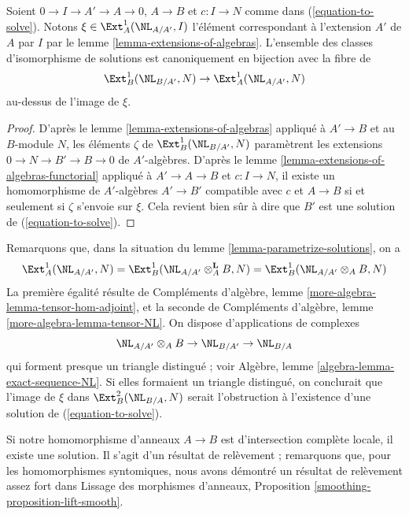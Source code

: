 \begin{lemma}
\label{lemma-parametrize-solutions}
Soient $0 \to I \to A' \to A \to 0$, $A \to B$ et $c : I \to N$ comme dans
(\ref{equation-to-solve}). Notons $\xi \in \Ext^1_A(\NL_{A/A'}, I)$
l'élément correspondant à l'extension $A'$ de $A$ par $I$ par le
lemme \ref{lemma-extensions-of-algebras}. L'ensemble des classes d'isomorphisme
de solutions est canoniquement en bijection avec la fibre de
$$
\Ext^1_B(\NL_{B/A'}, N) \to \Ext^1_A(\NL_{A/A'}, N)
$$
au-dessus de l'image de $\xi$.
\end{lemma}

\begin{proof}
D'après le lemme \ref{lemma-extensions-of-algebras} appliqué à $A' \to B$ et au
$B$-module $N$, les éléments $\zeta$ de $\Ext^1_B(\NL_{B/A'}, N)$
paramètrent les extensions $0 \to N \to B' \to B \to 0$ de $A'$-algèbres.
D'après le lemme \ref{lemma-extensions-of-algebras-functorial} appliqué
à $A' \to A \to B$ et $c : I \to N$, il existe un homomorphisme de $A'$-algèbres
$A' \to B'$ compatible avec $c$ et $A \to B$ si et seulement si
$\zeta$ s'envoie sur $\xi$. Cela revient bien sûr à dire que $B'$ est une
solution de (\ref{equation-to-solve}).
\end{proof}

\begin{remark}
\label{remark-parametrize-solutions}
Remarquons que, dans la situation du lemme \ref{lemma-parametrize-solutions},
on a
$$
\Ext^1_A(\NL_{A/A'}, N) =
\Ext^1_B(\NL_{A/A'} \otimes_A^\mathbf{L} B, N) =
\Ext^1_B(\NL_{A/A'} \otimes_A B, N)
$$
La première égalité résulte de
Compléments d'algèbre, lemme \ref{more-algebra-lemma-tensor-hom-adjoint}, et
la seconde de
Compléments d'algèbre, lemme \ref{more-algebra-lemma-tensor-NL}.
On dispose d'applications de complexes
$$
\NL_{A/A'} \otimes_A B \to \NL_{B/A'} \to \NL_{B/A}
$$
qui forment presque un triangle distingué ; voir
Algèbre, lemme \ref{algebra-lemma-exact-sequence-NL}.
Si elles formaient un triangle distingué, on conclurait
que l'image de $\xi$ dans $\Ext^2_B(\NL_{B/A}, N)$
serait l'obstruction à l'existence d'une solution de
(\ref{equation-to-solve}).
\end{remark}

\noindent
Si notre homomorphisme d'anneaux $A \to B$ est d'intersection complète locale, il existe
une solution. Il s'agit d'un résultat de relèvement ; remarquons que,
pour les homomorphismes syntomiques, nous avons démontré un résultat de relèvement assez fort dans
Lissage des morphismes d'anneaux, Proposition \ref{smoothing-proposition-lift-smooth}.


